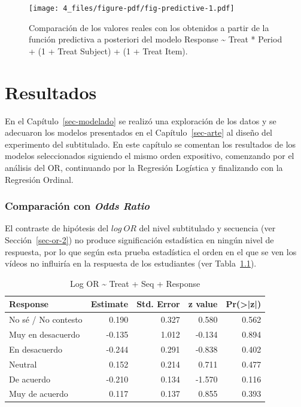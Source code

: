 \documentclass[
  12pt,
  a4paper,
  extrafontsizes,
  onecolumn,
  openright,
  table]{memoir}
\begin{document}
\begin{figure}[h]

{\centering \texttt{[image: 4\_files/figure-pdf/fig-predictive-1.pdf]}

}

\caption[Verificación usando la función predictiva a posteriori del
modelo seleccionado.]{\label{fig-predictive}Comparación de los valores
reales con los obtenidos a partir de la función predictiva a posteriori
del modelo Response \textasciitilde{} Treat * Period + (1 + Treat
\textbar{} Subject) + (1 + Treat \textbar{} Item).}

\end{figure}


\hypertarget{sec-resultados}{%
\chapter{Resultados}\label{sec-resultados}}

En el Capítulo~\ref{sec-modelado} se realizó una exploración de los
datos y se adecuaron los modelos presentados en el
Capítulo~\ref{sec-arte} al diseño del experimento del subtitulado. En
este capítulo se comentan los resultados de los modelos seleccionados
siguiendo el mismo orden expositivo, comenzando por el análisis del
\gls{OR}, continuando por la \gls{Regresión Logística} y finalizando con
la \gls{Regresión Ordinal}.

\hypertarget{sec-or-3}{%
\subsection{\texorpdfstring{Comparación con \emph{Odds
Ratio}}{Comparación con Odds Ratio}}\label{sec-or-3}}

El contraste de hipótesis del \(log\ OR\) del nivel subtitulado y
secuencia (ver Sección~\ref{sec-or-2}) no produce significación
estadística en ningún nivel de respuesta, por lo que según esta prueba
estadística el orden en el que se ven los vídeos no influiría en la
respuesta de los estudiantes (ver Tabla~\ref{tbl-logor1}).

\hypertarget{tbl-logor1}{}
\begin{longtable}{lrrrr}
\caption{\label{tbl-logor1}Log OR \textasciitilde{} Treat + Seq + Response }\tabularnewline

\toprule
Response & Estimate & Std. Error & z value & Pr(>|z|) \\ 
\midrule
No sé / No contesto & 0.190 & 0.327 & 0.580 & 0.562 \\ 
Muy en desacuerdo & -0.135 & 1.012 & -0.134 & 0.894 \\ 
En desacuerdo & -0.244 & 0.291 & -0.838 & 0.402 \\ 
Neutral & 0.152 & 0.214 & 0.711 & 0.477 \\ 
De acuerdo & -0.210 & 0.134 & -1.570 & 0.116 \\ 
Muy de acuerdo & 0.117 & 0.137 & 0.855 & 0.393 \\ 
\bottomrule
\end{longtable}
\end{document}
